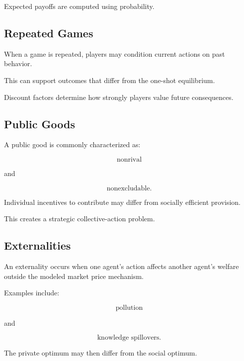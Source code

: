 Expected payoffs are computed using probability.

\subsection{Repeated Games}
\label{subsec:repeated-games-economics}

When a game is repeated, players may condition current actions on past
behavior.

This can support outcomes that differ from the one-shot equilibrium.

Discount factors determine how strongly players value future consequences.

\subsection{Public Goods}
\label{subsec:public-goods}

A public good is commonly characterized as:

\[
\boxed{
\text{nonrival}
}
\]

and

\[
\boxed{
\text{nonexcludable}.
}
\]

Individual incentives to contribute may differ from socially efficient
provision.

This creates a strategic collective-action problem.

\subsection{Externalities}
\label{subsec:economic-externalities}

An externality occurs when one agent's action affects another agent's welfare
outside the modeled market price mechanism.

Examples include:

\[
\boxed{
\text{pollution}
}
\]

and

\[
\boxed{
\text{knowledge spillovers}.
}
\]

The private optimum may then differ from the social optimum.

